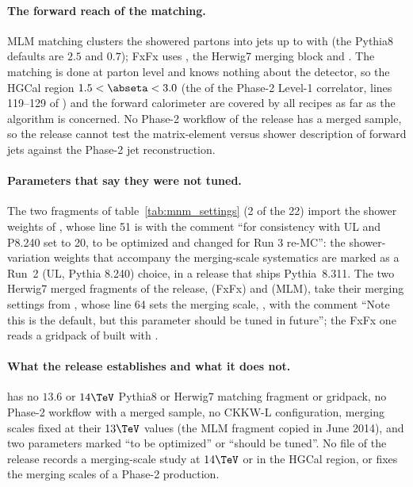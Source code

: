 \paragraph{The forward reach of the matching.}
MLM matching clusters the showered partons into jets up to  with  (the Pythia8 defaults are $2.5$ and $0.7$); FxFx uses , the Herwig7 merging block
 and . The matching is done at parton level and knows nothing about the detector,
so the HGCal region $1.5<\abseta<3.0$ (the  of the Phase-2 Level-1 correlator, lines 119--129 of
) and the forward calorimeter are covered by all recipes
as far as the algorithm is concerned. No Phase-2 workflow of the release has a merged sample, so the release cannot
test the matrix-element versus shower description of forward jets against the Phase-2 jet reconstruction.

\paragraph{Parameters that say they were not tuned.}
The two fragments of table~\ref{tab:mnm_settings} (2 of the 22) import the shower weights of
, whose line 51 is  with
the comment ``for consistency with UL and P8.240 set to 20, to be optimized and changed for Run 3 re-MC'': the
shower-variation weights that accompany the merging-scale systematics are marked as a Run~2 (UL, Pythia 8.240) choice,
in a release that ships Pythia~8.311. The two Herwig7 merged fragments of the release,
 (FxFx) and
 (MLM), take their merging settings from
, whose line 64 sets the merging scale, , with the comment ``Note this is the default, but this parameter should be tuned in future''; the FxFx one
reads a gridpack of  built with .

\paragraph{What the release establishes and what it does not.}
 has no $13.6$ or $14\TeV$ Pythia8 or Herwig7 matching fragment or gridpack, no Phase-2 workflow
with a merged sample, no CKKW-L configuration, merging scales fixed at their $13\TeV$ values (the MLM fragment copied
in June 2014), and two parameters marked ``to be optimized'' or ``should be tuned''. No file of the release records a
merging-scale study at $14\TeV$ or in the HGCal region, or fixes the merging scales of a Phase-2 production.
